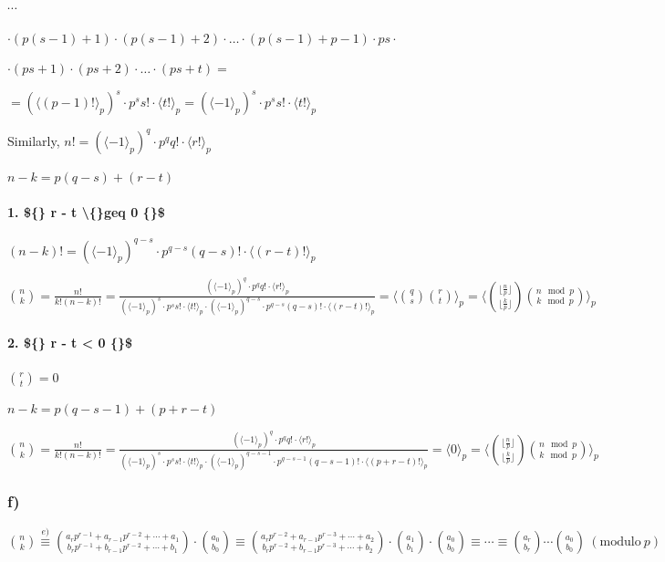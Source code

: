 \documentclass{article}
\begin{document}
$\cdots$

$\cdot (p(s-1)+1) \cdot (p(s-1)+2) \cdot \ldots \cdot (p(s-1) + p-1) \cdot ps \cdot$

$\cdot (ps+1) \cdot (ps+2) \cdot \ldots \cdot (ps + t) =$

$= (\langle(p-1)!\rangle_p)^s \cdot p^s s! \cdot \langle t!\rangle_p = (\langle-1\rangle_p)^s \cdot p^s s! \cdot \langle t!\rangle_p$

Similarly, $n! = (\langle-1\rangle_p)^q \cdot p^q q! \cdot \langle r!\rangle_p$

$n - k = p(q-s) + (r - t)$

\paragraph*{1. \$\{\} r - t \textbackslash\{\}geq 0 \{\}\$}

$(n-k)! = (\langle-1\rangle_p)^{q-s} \cdot p^{q-s} (q-s)! \cdot \langle (r-t)!\rangle_p$

$\binom{n}{k} = \frac{n!}{k!(n-k)!} = \frac{(\langle-1\rangle_p)^q \cdot p^q q! \cdot \langle r!\rangle_p}{(\langle-1\rangle_p)^s \cdot p^s s! \cdot \langle t!\rangle_p \cdot (\langle-1\rangle_p)^{q-s} \cdot p^{q-s} (q-s)! \cdot \langle (r-t)!\rangle_p} = \langle\binom{q}{s}\binom{r}{t}\rangle_p = \langle\binom{\lfloor\frac{n}{p}\rfloor}{\lfloor\frac{k}{p}\rfloor}\binom{n \mod p}{k \mod p}\rangle_p$

\paragraph*{2. \$\{\} r - t < 0 \{\}\$}

$\binom{r}{t} = 0$

$n - k = p(q-s-1) + (p + r -t)$

$\binom{n}{k} = \frac{n!}{k!(n-k)!} = \frac{(\langle-1\rangle_p)^q \cdot p^q q! \cdot \langle r!\rangle_p}{(\langle-1\rangle_p)^s \cdot p^s s! \cdot \langle t!\rangle_p \cdot (\langle-1\rangle_p)^{q-s-1} \cdot p^{q-s-1} (q-s-1)! \cdot \langle (p+r-t)!\rangle_p} = \langle 0 \rangle_p = \langle\binom{\lfloor\frac{n}{p}\rfloor}{\lfloor\frac{k}{p}\rfloor}\binom{n \mod p}{k \mod p}\rangle_p$

\subsubsection*{f)}

$\binom{n}{k} \overset{e)}{\equiv} \binom{a_rp^{r-1} + a_{r-1} p^{r-2} + \cdots + a_1}{b_rp^{r-1} + b_{r-1} p^{r-2} + \cdots + b_1} \cdot \binom{a_0}{b_0} \equiv \binom{a_rp^{r-2} + a_{r-1} p^{r-3} + \cdots + a_2}{b_rp^{r-2} + b_{r-1} p^{r-3} + \cdots + b_2} \cdot \binom{a_1}{b_1} \cdot \binom{a_0}{b_0} \equiv \cdots \equiv \binom{a_r}{b_r} \cdots \binom{a_0}{b_0}\ (\mathrm{modulo}\ p)$
\end{document}
